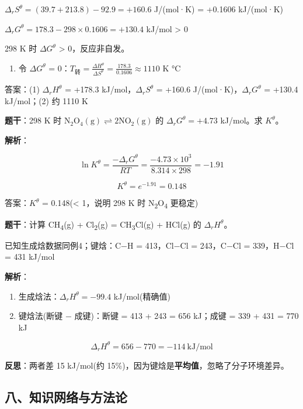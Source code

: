 \(\Delta_r S^\theta = (39.7 + 213.8) - 92.9 = +160.6\) J/(mol·K) = +0.1606 kJ/(mol·K)

\(\Delta_r G^\theta = 178.3 - 298 \times 0.1606 = +130.4\) kJ/mol \textgreater{} 0

298 K 时 \(\Delta G^\theta\) \textgreater{} 0，反应非自发。

\begin{enumerate}
\def\labelenumi{(\arabic{enumi})}
\setcounter{enumi}{1}
\tightlist
\item
  令 \(\Delta G^\theta\) = 0：\(T_{\text{转}} = \frac{\Delta H^\theta}{\Delta S^\theta} = \frac{178.3}{0.1606} \approx 1110\) K °C
\end{enumerate}

答案：(1) \(\Delta_r H^\theta\) = +178.3 kJ/mol，\(\Delta_r S^\theta\) = +160.6 J/(mol·K)，\(\Delta_r G^\theta\) = +130.4 kJ/mol；(2) 约 1110 K

\textbf{题干}：298 K 时 \(\mathrm{N_2O_4(g) \rightleftharpoons 2NO_2(g)}\) 的 \(\Delta_r G^\theta = +4.73\) kJ/mol。求 \(K^\theta\)。

\textbf{解析}：

\[\ln K^\theta = \frac{-\Delta_r G^\theta}{RT} = \frac{-4.73 \times 10^3}{8.314 \times 298} = -1.91\]

\[K^\theta = e^{-1.91} = 0.148\]

答案：\(K^\theta\) = 0.148(\textless{} 1，说明 298 K 时 N\textsubscript{2}O\textsubscript{4} 更稳定)

\textbf{题干}：计算 CH\textsubscript{4}(g) + Cl\textsubscript{2}(g) = CH\textsubscript{3}Cl(g) + HCl(g) 的 \(\Delta_r H^\theta\)。

已知生成焓数据同例4；键焓：C−H = 413，Cl−Cl = 243，C−Cl = 339，H−Cl = 431 kJ/mol

\textbf{解析}：

\begin{enumerate}
\def\labelenumi{(\arabic{enumi})}
\item
  生成焓法：\(\Delta_r H^\theta = -99.4\) kJ/mol(精确值)
\item
  键焓法(断键 − 成键)：断键 = 413 + 243 = 656 kJ；成键 = 339 + 431 = 770 kJ
\end{enumerate}

\[\Delta_r H^\theta = 656 - 770 = -114\ \mathrm{kJ/mol}\]

\textbf{反思}：两者差 15 kJ/mol(约 15\%)，因为键焓是\textbf{平均值}，忽略了分子环境差异。

\subsection{八、知识网络与方法论}\label{ux516bux77e5ux8bc6ux7f51ux7edcux4e0eux65b9ux6cd5ux8bba}

